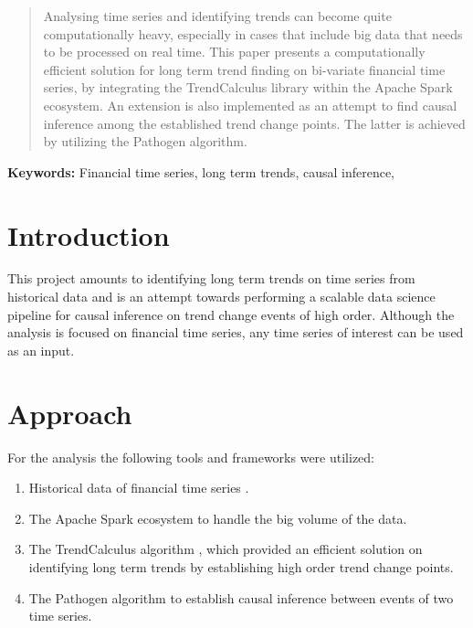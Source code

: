 \documentclass[a4, 11pt]{article}
\begin{document}
\newpage
\begin{abstract}
    Analysing time series and identifying trends can become quite computationally heavy, especially in cases that include big data that needs to be processed on real time. This paper presents a computationally efficient solution for long term trend finding on bi-variate financial time series, by integrating the TrendCalculus library within the Apache Spark ecosystem. An extension is also implemented as an attempt to find causal inference among the established trend change points. The latter is achieved by utilizing the Pathogen algorithm. 
    
\end{abstract}
\begin{center}
    \textbf{Keywords:} Financial time series, long term trends, causal inference, 
\end{center}
\setcounter{page}{2}
\newpage


\tableofcontents
\newpage


\section{Introduction}
This project amounts to identifying long term trends on time series from historical data and is an attempt towards performing a scalable data science pipeline for causal inference on trend change events of high order. Although the analysis is focused on financial time series, any time series of interest can be used as an input. 


\section{Approach}
For the analysis the following tools and frameworks were utilized:
    \begin{enumerate}
        \item Historical data of financial time series \cite{HistData}.
        \item The Apache Spark ecosystem to handle the big volume of the data. 
        \item The TrendCalculus algorithm \cite{TrendCalculus}, which provided an efficient solution on identifying long term trends by establishing high order trend change points.
        \item The Pathogen algorithm \cite{Pathogen} to establish causal inference between events of two time series. 
    \end{enumerate}
    
\end{document}
